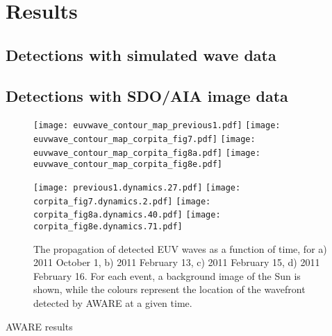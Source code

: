\section{Results}\label{sec:results}

\subsection{Detections with simulated wave data}

\subsection{Detections with SDO/AIA image data}

\begin{figure}
\begin{center}
\texttt{[image: euvwave\_contour\_map\_previous1.pdf]}
\texttt{[image: euvwave\_contour\_map\_corpita\_fig7.pdf]}
\texttt{[image: euvwave\_contour\_map\_corpita\_fig8a.pdf]}
\texttt{[image: euvwave\_contour\_map\_corpita\_fig8e.pdf]}

\texttt{[image: previous1.dynamics.27.pdf]}
\texttt{[image: corpita\_fig7.dynamics.2.pdf]}
\texttt{[image: corpita\_fig8a.dynamics.40.pdf]}
\texttt{[image: corpita\_fig8e.dynamics.71.pdf]}
\caption{The propagation of detected EUV waves as a function of time, for a) 2011 October 1, b) 2011 February 13, c) 2011 February 15, d) 2011 February 16. For each event, a background image of the Sun is shown, while the colours represent the location of the wavefront detected by AWARE at a given time.}
\end{center}
\end{figure}

AWARE results
